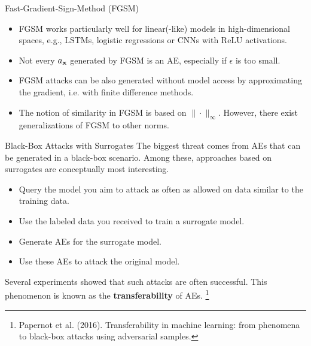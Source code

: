 \documentclass[11pt,compress,t,notes=noshow, aspectratio=169, xcolor=table]{beamer}
\begin{document}
\begin{vbframe}{Fast-Gradient-Sign-Method (FGSM)}
\begin{itemize}
    \item FGSM works particularly well for linear(-like) models in high-dimensional spaces, e.g., LSTMs, logistic regressions or CNNs with ReLU activations.
    \item Not every $a_{\xv}$ generated by FGSM is an AE, especially if $\epsilon$ is too small.
    \item FGSM attacks can be also generated without model access by approximating the gradient, i.e. with finite difference methods.
    \item The notion of similarity in FGSM is based on $\|\cdot\|_{\infty}$. However, there exist generalizations of FGSM to other norms.
\end{itemize}
\end{vbframe}


\begin{vbframe}{Black-Box Attacks with Surrogates}
The biggest threat comes from AEs that can be generated in a black-box scenario. Among these, approaches based on surrogates are conceptually most interesting.
\begin{itemize}
    \item Query the model you aim to attack as often as allowed on data similar to the training data.
    \item Use the labeled data you received to train a surrogate model.%
    \item %
    Generate AEs for the surrogate model.%
    \item Use these AEs to attack the original model.
\end{itemize}
Several experiments showed that such attacks are often successful. %
This phenomenon is known as the \textbf{transferability} of AEs.
%
%
\footnote[frame]{Papernot et al. (2016). Transferability in machine learning: from phenomena to black-box attacks using adversarial samples.}
\end{vbframe}
\end{document}
